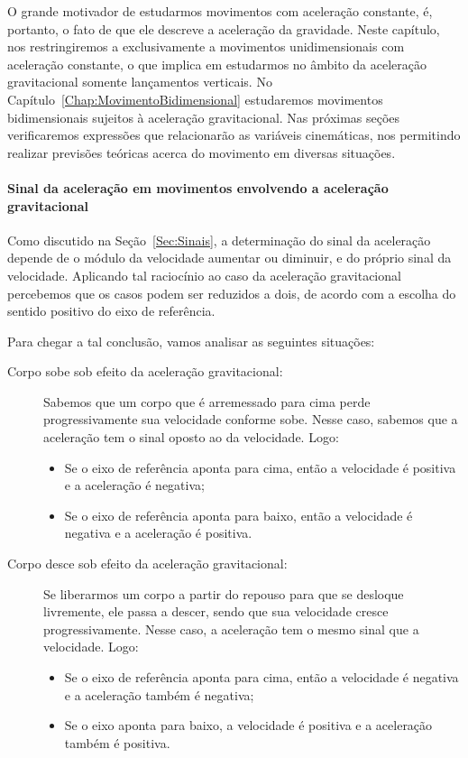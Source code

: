 O grande motivador de estudarmos movimentos com aceleração constante, é, portanto, o fato de que ele descreve a aceleração da gravidade. Neste capítulo, nos restringiremos a exclusivamente a movimentos unidimensionais com aceleração constante, o que implica em estudarmos no âmbito da aceleração gravitacional somente lançamentos verticais. No Capítulo~\ref{Chap:MovimentoBidimensional} estudaremos movimentos bidimensionais sujeitos à aceleração gravitacional. Nas próximas seções verificaremos expressões que relacionarão as variáveis cinemáticas, nos permitindo realizar previsões teóricas acerca do movimento em diversas situações.

\paragraph{Sinal da aceleração em movimentos envolvendo a aceleração gravitacional}

Como discutido na Seção~\ref{Sec:Sinais}, a determinação do sinal da aceleração depende de o módulo da velocidade aumentar ou diminuir, e do próprio sinal da velocidade. Aplicando tal raciocínio ao caso da aceleração gravitacional percebemos que os casos podem ser reduzidos a dois, de acordo com a escolha do sentido positivo do eixo de referência.

Para chegar a tal conclusão, vamos analisar as seguintes situações:
\begin{description}
    \item[Corpo sobe sob efeito da aceleração gravitacional:] Sabemos que um corpo que é arremessado para cima perde progressivamente sua velocidade conforme sobe. Nesse caso, sabemos que a aceleração tem o sinal oposto ao da velocidade. Logo:
    \begin{itemize}
        \item Se o eixo de referência aponta para cima, então a velocidade é positiva e a aceleração é negativa;
        \item Se o eixo de referência aponta para baixo, então a velocidade é negativa e a aceleração é positiva.
     \end{itemize}
    \item[Corpo desce sob efeito da aceleração gravitacional:] Se liberarmos um corpo a partir do repouso para que se desloque livremente, ele passa a descer, sendo que sua velocidade cresce progressivamente. Nesse caso, a aceleração tem o mesmo sinal que a velocidade. Logo:
    \begin{itemize}
        \item Se o eixo de referência aponta para cima, então a velocidade é negativa e a aceleração também é negativa;
        \item Se o eixo aponta para baixo, a velocidade é positiva e a aceleração também é positiva.
    \end{itemize}
\end{description}

